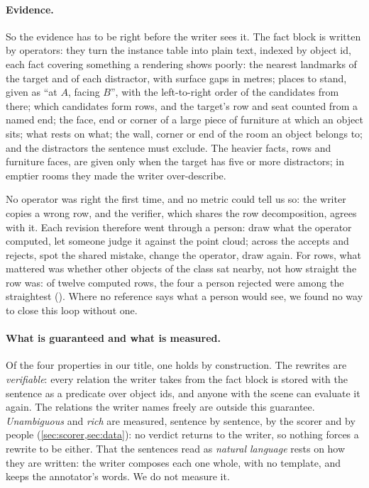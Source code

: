 \paragraph{Evidence.}
So the evidence has to be right before the writer sees it.
The fact block is written by operators: they turn the instance table into plain text, indexed by object id, each fact covering something a rendering shows poorly:
the nearest landmarks of the target and of each distractor, with surface gaps in metres;
places to stand, given as ``at $A$, facing $B$'', with the left-to-right order of the candidates from there;
which candidates form rows, and the target's row and seat counted from a named end;
the face, end or corner of a large piece of furniture at which an object sits;
what rests on what;
the wall, corner or end of the room an object belongs to;
and the distractors the sentence must exclude.
The heavier facts, rows and furniture faces, are given only when the target has five or more distractors; in emptier rooms they made the writer over-describe.

No operator was right the first time, and no metric could tell us so: the writer copies a wrong row, and the verifier, which shares the row decomposition, agrees with it.
Each revision therefore went through a person: draw what the operator computed, let someone judge it against the point cloud; across the accepts and rejects, spot the shared mistake, change the operator, draw again.
For rows, what mattered was whether other objects of the class sat nearby, not how straight the row was: of twelve computed rows, the four a person rejected were among the straightest ().
Where no reference says what a person would see, we found no way to close this loop without one.

\paragraph{What is guaranteed and what is measured.}
Of the four properties in our title, one holds by construction.
The rewrites are \emph{verifiable}: every relation the writer takes from the fact block is stored with the sentence as a predicate over object ids, and anyone with the scene can evaluate it again.
The relations the writer names freely are outside this guarantee.
\emph{Unambiguous} and \emph{rich} are measured, sentence by sentence, by the scorer and by people (\cref{sec:scorer,sec:data}): no verdict returns to the writer, so nothing forces a rewrite to be either.
That the sentences read as \emph{natural language} rests on how they are written: the writer composes each one whole, with no template, and keeps the annotator's words.
We do not measure it.
